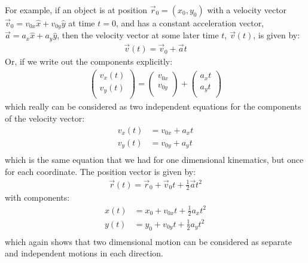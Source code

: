 For example, if an object is at position $\vec r_0=(x_0,y_0)$ with a velocity vector $\vec v_0=v_{0x}\hat x + v_{0y}\hat y$ at time $t=0$, and has a constant acceleration vector, $\vec a = a_x\hat x+a_y\hat y$, then the velocity vector at some later time $t$, $\vec v(t)$, is given by:
\begin{align*}
\vec v(t) = \vec v_0 + \vec a t
\end{align*}
Or, if we write out the components explicitly:
\begin{align*}
\begin{pmatrix}
           v_x(t) \\
           v_y(t) \\
         \end{pmatrix} = \begin{pmatrix}
           v_{0x} \\
           v_{0y} \\
         \end{pmatrix} + \begin{pmatrix}
           a_xt \\
           a_yt \\
         \end{pmatrix}
\end{align*}
which really can be considered as two independent equations for the components of the velocity vector:
\begin{align*}
v_x(t)&=v_{0x}+a_xt \\
v_y(t)&=v_{0y}+a_yt \\
\end{align*}
which is the same equation that we had for one dimensional kinematics, but once for each coordinate. The position vector is given by:
\begin{align*}
\vec r(t) = \vec r_0 + \vec v_0 t + \frac{1}{2} \vec at^2
\end{align*}
with components:
\begin{align*}
x(t) &= x_0+v_{0x}t+\frac{1}{2}a_xt^2\\
y(t) &= y_0+v_{0y}t+\frac{1}{2}a_yt^2\\
\end{align*}
which again shows that two dimensional motion can be considered as separate and independent motions in each direction.

